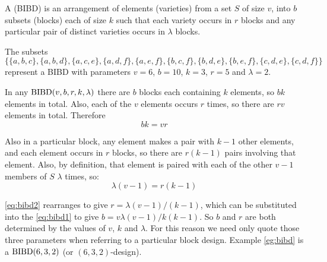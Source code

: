 A  (BIBD) is an arrangement of elements (varieties) from a set $S$ of size $v$, into $b$ subsets (blocks) each of size $k$ such that each variety occurs in $r$ blocks and any particular pair of distinct varieties occurs in $\lambda$ blocks.

\begin{example}
\label{eg:bibd}
The subsets
\begin{equation*}
\label{eq:bibd}
  \{\{a,b,c\}, \{a,b,d\}, \{a,c,e\}, \{a,d,f\}, \{a,e,f\}, \{b,c,f\}, \{b,d,e\}, \{b,e,f\}, \{c,d,e\}, \{c,d,f\}\}
\end{equation*}
represent a BIBD with parameters $v = 6$, $b = 10$, $k = 3$, $r = 5$ and $\lambda = 2$.
\end{example}

In any $\operatorname{BIBD}(v, b, r, k, \lambda)$ there are $b$ blocks each containing $k$ elements, so $bk$ elements in total.
Also, each of the $v$ elements occurs $r$ times, so there are $rv$ elements in total.
Therefore
\begin{equation}
\label{eq:bibd1}
bk = vr
\end{equation}

Also in a particular block, any element makes a pair with $k - 1$ other elements, and each element occurs in $r$ blocks, so there are $r(k - 1)$ pairs involving that element.
Also, by definition, that element is paired with each of the other $v - 1$ members of $S$ $\lambda$ times, so:
\begin{equation}
\label{eq:bibd2}
\lambda (v - 1) = r(k - 1)
\end{equation}

\eqref{eq:bibd2} rearranges to give $r = \lambda (v - 1)/(k - 1)$, which can be substituted into the \eqref{eq:bibd1} to give $b = v\lambda (v - 1)/k(k - 1)$.
So $b$ and $r$ are both determined by the values of $v$, $k$ and $\lambda$.
For this reason we need only quote those three parameters when referring to a particular block design.
Example \ref{eg:bibd} is a $\operatorname{BIBD}(6, 3, 2)$ (or $(6, 3, 2)$-design).
